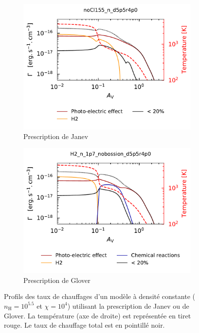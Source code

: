 \begin{figure}[!h]
    \centering
    \begin{subfigure}[t]{0.49\textwidth} %
        \centering \includegraphics[trim = {0 0 0 1cm },clip,width=1\textwidth]{figure/H2/bosse_dcte_janevVSglover/janev/heat.pdf}
        \caption{Prescription de Janev}
    \end{subfigure}
    \begin{subfigure}[t]{0.49\textwidth}
        \centering \includegraphics[trim = {0 0 0 1cm },clip,width=1\textwidth]{figure/H2/bosse_dcte_janevVSglover/glover/heat.pdf}
        \caption{Prescription de Glover}
    \end{subfigure}
    \caption{Profils des taux de chauffages d'un modèle à densité constante ($n_\mathrm{H} = 10^{5.5}$ et $\chi = 10^4$) utilisant la prescription de Janev ou de Glover. La température (axe de droite) est représentée en tiret rouge. Le taux de chauffage total est en pointillé noir.}
    \label{fig:H2:bosse:heat}
\end{figure}


